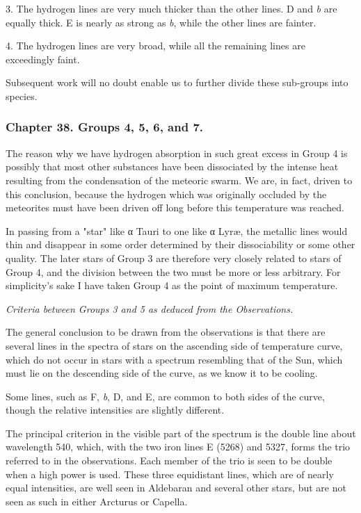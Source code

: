 \documentclass[a4paper, 12pt, oneside, polutonikogreek, english]{article}
\begin{document}
3. The hydrogen lines are very much thicker than the other lines. D and \emph{b} are equally thick. E is nearly as strong as \emph{b}, while the other lines are fainter.

4. The hydrogen lines are very broad, while all the remaining lines are exceedingly faint.

Subsequent work will no doubt enable us to further divide these sub-groups into species.

\subsubsection{Chapter 38. Groups 4, 5, 6, and 7.}

The reason why we have hydrogen absorption in such great excess in Group 4 is possibly that most other substances have been dissociated by the intense heat resulting from the condensation of the meteoric swarm. We are, in fact, driven to this conclusion, because the hydrogen which was originally occluded by the meteorites must have been driven off long before this temperature was reached.

In passing from a "star" like α Tauri to one like α Lyræ, the metallic lines would thin and disappear in some order determined by their dissociability or some other quality. The later stars of Group 3 are therefore very closely related to stars of Group 4, and the division between the two must be more or less arbitrary. For simplicity's sake I have taken Group 4 as the point of maximum temperature.

\emph{Criteria between Groups 3 and 5 as deduced from the Observations.}

The general conclusion to be drawn from the observations is that there are several lines in the spectra of stars on the ascending side of temperature curve, which do not occur in stars with a spectrum resembling that of the Sun, which must lie on the descending side of the curve, as we know it to be cooling.

Some lines, such as F, \emph{b}, D, and E, are common to both sides of the curve, though the relative intensities are slightly different.

The principal criterion in the visible part of the spectrum is the double line about wavelength 540, which, with the two iron lines E (5268) and 5327, forms the trio referred to in the observations. Each member of the trio is seen to be double when a high power is used. These three equidistant lines, which are of nearly equal intensities, are well seen in Aldebaran and several other stars, but are not seen as such in either Arcturus or Capella.
\end{document}
